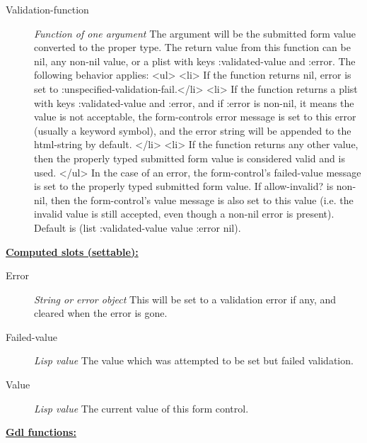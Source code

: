 \documentclass [11pt]{book}
\begin{document}
\begin{itemize}
\begin{description}
\item [Validation-function]
\emph{Function of one argument} The argument will be the submitted form value converted to the proper type.
The return value from this function can be nil, any non-nil value, or a plist with keys :validated-value
and :error. The following behavior applies:
<ul>
<li> If the function returns nil, error is set to  :unspecified-validation-fail.</li>
<li> If the function returns a plist with keys :validated-value and :error, and if :error is non-nil,
it means the value is not acceptable, the form-controls error message is set to this error (usually a keyword symbol),
and the error string will be appended to the html-string by default. </li>
<li> If the function returns any other value, then the properly typed submitted form value is considered valid and is used.
</ul>
In the case of an error, the form-control's failed-value message is set to the properly typed submitted form value. If
allow-invalid? is non-nil, then the form-control's value message is also set to this value (i.e. the invalid value is
still accepted, even though a non-nil error is present).
Default is (list :validated-value value :error nil).


\end{description}






\textbf{
\underline{Computed slots (settable):}}

\begin{description}

\item [Error]
\emph{String or error object} This will be set to a validation error if any,
and cleared when the error is gone.


\item [Failed-value]
\emph{Lisp value} The value which was attempted to be set but failed validation.


\item [Value]
\emph{Lisp value} The current value of this form control.


\end{description}






\textbf{
\underline{Gdl functions:}}

\begin{description}


\end{description}
\end{itemize}
\end{document}
